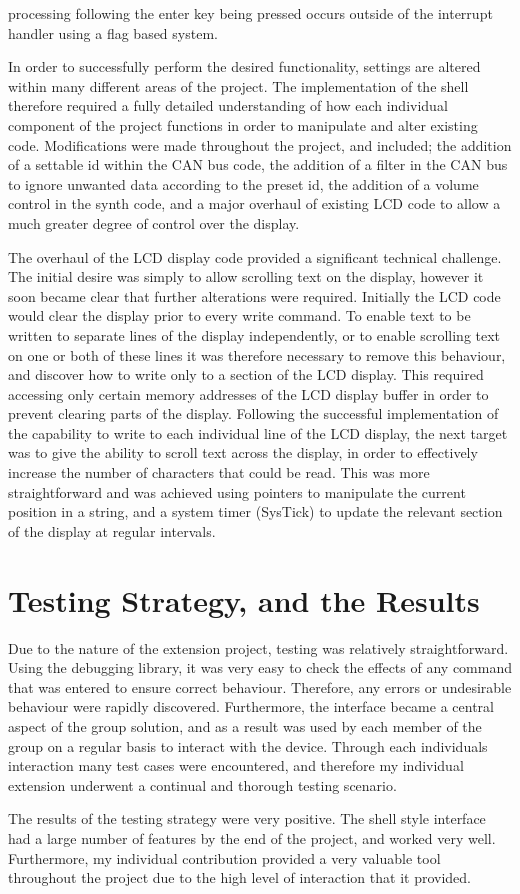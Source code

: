 processing following the enter key being pressed occurs outside of the interrupt 
handler using a flag based system.
\par\bigskip\noindent
In order to successfully perform the desired functionality, settings are altered 
within many different areas of the project. The implementation of the shell 
therefore required a fully detailed understanding of how each individual 
component of the project functions in order to manipulate and alter existing 
code. Modifications were made throughout the project, and included; the addition 
of a settable id within the CAN bus code, the addition of a filter in the CAN 
bus to ignore unwanted data according to the preset id, the addition of a 
volume control in the synth code, and a major overhaul of existing LCD code to 
allow a much greater degree of control over the display. 
\par\bigskip\noindent
The overhaul of the LCD display code provided a significant technical challenge. 
The initial desire was simply to allow scrolling text on the display, however 
it soon became clear that further alterations were required. Initially the LCD 
code would clear the display prior to every write command. To enable text to be 
written to separate lines of the display independently, or to enable scrolling 
text on one or both of these lines it was therefore necessary to remove this 
behaviour, and discover how to write only to a section of the LCD display. 
This required accessing only certain memory addresses of the LCD display buffer 
in order to prevent clearing parts of the display. Following the successful 
implementation of the capability to write to each individual line of the LCD 
display, the next target was to give the ability to scroll text across the 
display, in order to effectively increase the number of characters that could 
be read. This was more straightforward and was achieved using pointers to 
manipulate the current position in a string, and a system timer (SysTick) to 
update the relevant section of the display at regular intervals.

\section{Testing Strategy, and the Results}

Due to the nature of the extension project, testing was relatively straightforward. 
Using the debugging library, it was very easy to check the effects of any command 
that was entered to ensure correct behaviour. Therefore, any errors or undesirable 
behaviour were rapidly discovered. Furthermore, the interface became a central 
aspect of the group solution, and as a result was used by each member of the 
group on a regular basis to interact with the device. Through each individuals 
interaction many test cases were encountered, and therefore my individual extension 
underwent a continual and thorough testing scenario. 
\par\bigskip\noindent
The results of the testing strategy were very positive. The shell style interface 
had a large number of features by the end of the project, and worked very well. 
Furthermore, my individual contribution provided a very valuable tool throughout 
the project due to the high level of interaction that it provided. 
